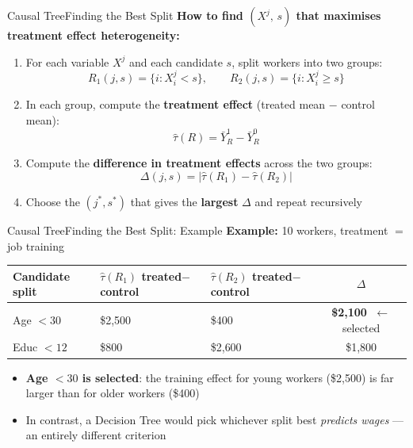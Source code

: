 \documentclass[dvipsnames,hyperref={pdfpagelabels=false}]{beamer}
\begin{document}
\begin{frame}{Causal Tree}{Finding the Best Split}
\textbf{How to find $(X^j,\, s)$ that maximises treatment effect heterogeneity:}
\vspace{0.25cm}
\begin{enumerate}
	\item For each variable $X^j$ and each candidate $s$, split workers into two groups:
	\[
		R_1(j,s) = \{i: X^j_i < s\}, \qquad R_2(j,s) = \{i: X^j_i \geq s\}
	\]

	\item In each group, compute the \textbf{treatment effect} (treated mean $-$ control mean):
	\[
		\hat{\tau}(R) = \bar{Y}^{1}_{R} - \bar{Y}^{0}_{R}
	\]

	\item Compute the \textbf{difference in treatment effects} across the two groups:
	\[
		\Delta(j,s) = |\hat{\tau}(R_1) - \hat{\tau}(R_2)|
	\]

	\item Choose the $(j^*, s^*)$ that gives the \textbf{largest} $\Delta$ and repeat recursively
\end{enumerate}
\end{frame}




\begin{frame}{Causal Tree}{Finding the Best Split: Example}
\textbf{Example:} 10 workers, treatment $=$ job training

\vspace{0.25cm}
\begin{center}
\small
\begin{tabular}{lp{2.5cm}p{2.5cm}c}
	\hline
	\textbf{Candidate split}
		& $\hat{\tau}(R_1)$ \newline treated$-$control
		& $\hat{\tau}(R_2)$ \newline treated$-$control
		& $\Delta$ \\
	\hline
	Age $< 30$   & \$2{,}500 & \$400   & \textbf{\$2{,}100} $\;\leftarrow$ selected \\
	Educ $< 12$  & \$800     & \$2{,}600 & \$1{,}800 \\
	\hline
\end{tabular}
\end{center}

\vspace{0.25cm}
\begin{itemize}
	\item \textbf{Age $< 30$ is selected}: the training effect for young workers (\$2,500) is far larger than for older workers (\$400)
	\vspace{0.2cm}
	\item In contrast, a Decision Tree would pick whichever split best \textit{predicts wages} --- an entirely different criterion
\end{itemize}
\end{frame}
\end{document}
